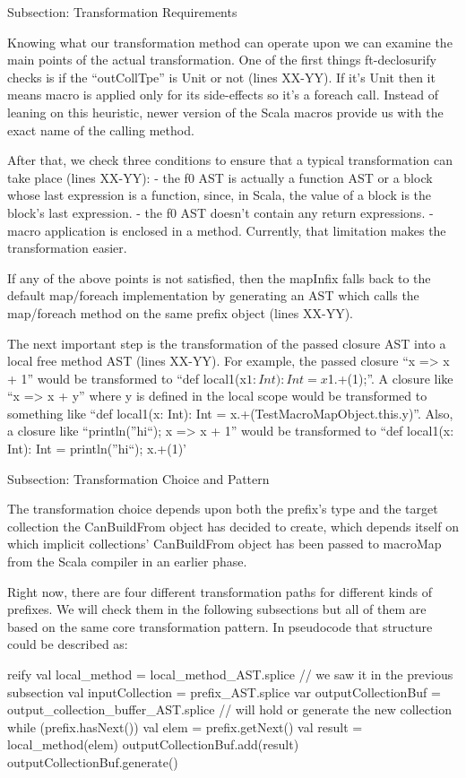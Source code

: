 Subsection: Transformation Requirements

Knowing what our transformation method can operate upon we can examine the
main points of the actual transformation. One of the first things ft-declosurify
checks is if the ``outCollTpe'' is Unit or not (lines XX-YY). If it's Unit then
it means
macro is applied only for its side-effects so it's a foreach call. Instead of
leaning on this heuristic, newer version of the Scala macros provide us with the
exact name of the calling method.

After that, we check three conditions to ensure that a typical
transformation can take place (lines XX-YY):
- the f0 AST is actually a function AST or a block whose last
expression is a function, since, in Scala, the value of a block is the block's
last expression.
- the f0 AST doesn't contain any return expressions.
- macro application is enclosed in a method. Currently, that limitation makes
the transformation easier.

If any of the above points is not satisfied, then the mapInfix falls back to the
default map/foreach implementation by generating an AST which
calls the map/foreach method on the same prefix object (lines XX-YY).

The next important step is the transformation of the passed closure AST
into a local free method AST (lines XX-YY). For example, the passed closure ``x
=> x + 1'' would be transformed to ``def local1(x$1: Int): Int = x$1.+(1);''. A
closure like ``x => x + y'' where y is defined in the local scope would be
transformed to something like ``def local1(x: Int): Int =
x.+(TestMacroMapObject.this.y)''. Also, a closure like ``{println(''hi``); x =>
x + 1}'' would be transformed to ``def local1(x: Int): Int = {println(''hi``);
x.+(1)}'

Subsection: Transformation Choice and Pattern

The transformation choice depends upon both the prefix's type and  the
target collection the CanBuildFrom object has decided to create, which depends
itself on which implicit collections' CanBuildFrom object has been passed to
macroMap from the Scala compiler in an earlier phase.

Right now, there are four different transformation paths for different kinds of
prefixes. We will check them in the following subsections but all of them are
based on the same core transformation pattern. In pseudocode that structure
could be described as:

reify {
  val local_method = local_method_AST.splice // we saw it in the previous
subsection
  val inputCollection = prefix_AST.splice
  var outputCollectionBuf = output_collection_buffer_AST.splice // will
hold or generate the new collection
  while (prefix.hasNext()) {
    val elem = prefix.getNext()
    val result = local_method(elem)
    outputCollectionBuf.add(result)
  }
  outputCollectionBuf.generate()
}

